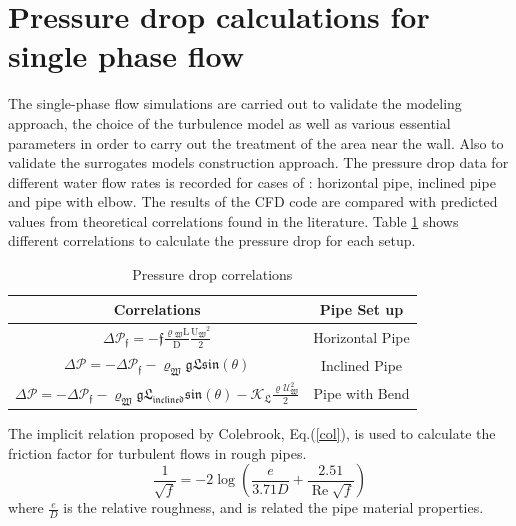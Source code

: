 \documentclass[11pt]{report}
\begin{document}
\section{Pressure drop calculations for single phase flow}\label{single}
%
The single-phase flow simulations are carried out to validate the modeling approach, the choice of the turbulence model as well as various essential parameters in order to carry out the treatment of the area near the wall. 
%
Also to validate the surrogates models construction  approach. 
%
The pressure drop data for different water flow rates is recorded for cases of : horizontal pipe, inclined pipe and pipe with elbow. 
%
The results of the CFD code are compared with predicted values from theoretical correlations found in the literature. 
%
Table \ref{tab:PD} shows different correlations to calculate the pressure drop for each setup.
%
\begin{table}[ht!]
\begin{center}
\caption{Pressure drop correlations}\label{tab:PD}
\begin{tabular}{cc}
\hline Correlations & Pipe Set up  \\
\hline
$ \displaystyle 
\Delta \mathcal{P_\mathfrak{f}=\mathfrak{-f}\frac{\mathrm{\varrho\mathfrak{_{W}}} \mathrm{L}}{\mathrm{D}} \frac{\mathrm{U\mathfrak{_{W}}}^\mathrm{{2}}}{\mathrm{2}}}
$ & Horizontal Pipe \\
$ \displaystyle 
\Delta \mathcal{P}=-\Delta \mathcal{P_\mathfrak{f}-\varrho_\mathfrak{{W}} \mathfrak{g} \mathfrak{ L} \mathfrak{sin(\theta)}}
$ & Inclined Pipe \\
$ \displaystyle 
\Delta \mathcal{P} =-\Delta \mathcal{ P_\mathfrak{f}-\varrho_\mathfrak{{W}} \mathfrak{g} \mathfrak{L}_\mathfrak{{inclined}} \mathfrak{sin(\theta)}- K_\mathfrak{{L}} \frac{\mathrm{\varrho} U_\mathfrak{{W}}^\mathrm{{2}}}{\mathrm{2}}}
$ & Pipe with Bend   \\
\hline
\end{tabular}
\end{center}
\end{table}
%
The implicit relation proposed by Colebrook, Eq.(\ref{col}), is used to calculate the friction factor for turbulent flows in rough pipes.
%
\begin{equation}
\frac{1}{\sqrt{f}}=-2 \log \left(\frac{e}{3.71 D}+\frac{2.51}{\operatorname{Re} \sqrt{f}}\right)
\label{col}
\end{equation}
%
where $\frac{e}{D}$ is the relative roughness, and is related the pipe material properties.
%
\end{document}

